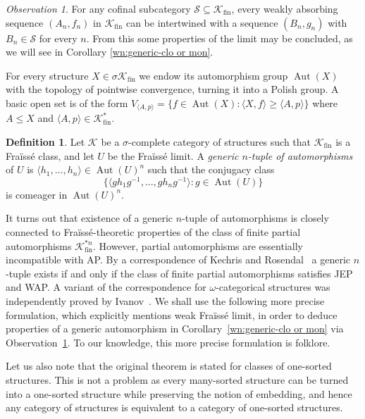 \documentclass[10pt,a4paper]{article}
\theoremstyle{definition}
\newtheorem{df}[tw]{Definition}
\theoremstyle{remark}
\newtheorem{observation}[tw]{Observation}
\newcommand \set [1]{\{#1\}}
\newcommand \seq [1]{\langle #1 \rangle}
\newcommand \Su {\mathscr{S}}
\newcommand \K {\mathscr{K}}
\newcommand \fin {{\operatorname{fin}}}
\newcommand \Aut {\operatorname{Aut}}
\begin{document}
\begin{observation} \label{obs:limit_from_cofinal}
    For any cofinal subcategory $\Su \subseteq \K_\fin$, 
    every weakly absorbing sequence $(A_n, f_n)$ in $\K_\fin$ can be intertwined with a sequence $(B_n, g_n)$ with $B_n \in \Su$ for every $n$.
    From this some properties of the limit may be concluded, as we will see in Corollary \ref{wn:generic-clo or mon}.
\end{observation}



For every structure $X \in \sigma\K_\fin$ we endow its automorphism group $\Aut(X)$ with the topology of pointwise convergence, turning it into a Polish group.
A basic open set is of the form $V_{\seq{A, p}} = \set{f \in \Aut(X) : \seq{X, f} \geq \seq{A, p}}$ where $A \leq X$ and $\seq{A, p} \in \K^*_\fin$.

\begin{df}
Let $\K$ be a $\sigma$-complete category of structures such that $\K_\fin$ is a Fraïssé class, and let $U$ be the Fraïssé limit.
A \emph{generic $n$-tuple of automorphisms} of $U$ is $\seq{h_1,\ldots, h_n}\in \Aut(U)^n$ such that the conjugacy class
\[
    \{\seq{g h_1 g^{-1},\ldots, g h_n g^{-1}}: g \in \Aut(U)\}
\]
is comeager in $\Aut(U)^n$.
\end{df}


It turns out that existence of a generic $n$-tuple of automorphisms is closely connected to Fraïssé-theoretic properties of the class of finite partial automorphisms $\K^{*n}_\fin$.
However, partial automorphisms are essentially incompatible with AP.
By a correspondence of Kechris and Rosendal~\cite[Theorem~6.2]{KR} a generic $n$-tuple exists if and only if the class of finite partial automorphisms satisfies JEP and WAP.
A variant of the correspondence for $\omega$-categorical structures was independently proved by Ivanov~\cite[Theorem~1.2]{Iv}.
We shall use the following more precise formulation, which explicitly mentions  weak Fraïssé limit, in order to deduce properties of a generic automorphism in Corollary~\ref{wn:generic-clo or mon} via Observation~\ref{obs:limit_from_cofinal}.
To our knowledge, this more precise formulation is folklore.

Let us also note that the original theorem is stated for classes of one-sorted structures. This is not a problem as every many-sorted structure can be turned into a one-sorted structure while preserving the notion of embedding, and hence any category of structures is equivalent to a category of one-sorted structures.
\end{document}
